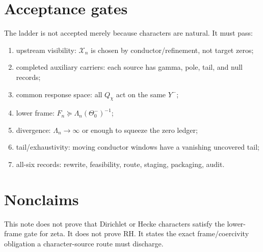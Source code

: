 \documentclass[11pt]{article}
\begin{document}
\section{Acceptance gates}
The ladder is not accepted merely because characters are natural.  It must pass:
\begin{enumerate}
\item upstream visibility: $\mathcal X_n$ is chosen by conductor/refinement, not target zeros;
\item completed auxiliary carriers: each source has gamma, pole, tail, and null records;
\item common response space: all $Q_\chi$ act on the same $Y^-$;
\item lower frame: $F_n\succeq\Lambda_n(\Theta_0^-)^{-1}$;
\item divergence: $\Lambda_n\to\infty$ or enough to squeeze the zero ledger;
\item tail/exhaustivity: moving conductor windows have a vanishing uncovered tail;
\item all-six records: rewrite, feasibility, route, staging, packaging, audit.
\end{enumerate}

\section{Nonclaims}
This note does not prove that Dirichlet or Hecke characters satisfy the lower-frame gate for zeta.  It does not prove RH.  It states the exact frame/coercivity obligation a character-source route must discharge.
\end{document}
